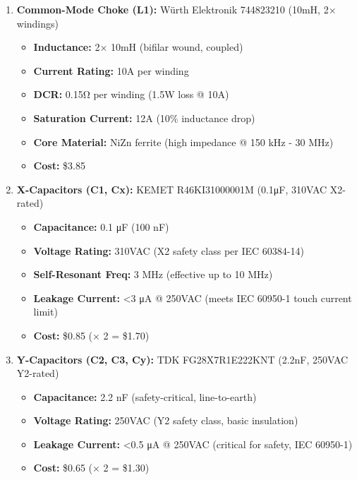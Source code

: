 \documentclass[
]{article}
\providecommand{\tightlist}{%
  \setlength{\itemsep}{0pt}\setlength{\parskip}{0pt}}
\begin{document}
\begin{enumerate}
\def\labelenumi{\arabic{enumi}.}
\tightlist
\item
  \textbf{Common-Mode Choke (L1):} Würth Elektronik 744823210 (10mH, 2×
  windings)

  \begin{itemize}
  \tightlist
  \item
    \textbf{Inductance:} 2× 10mH (bifilar wound, coupled)
  \item
    \textbf{Current Rating:} 10A per winding
  \item
    \textbf{DCR:} 0.15Ω per winding (1.5W loss @ 10A)
  \item
    \textbf{Saturation Current:} 12A (10\% inductance drop)
  \item
    \textbf{Core Material:} NiZn ferrite (high impedance @ 150 kHz - 30
    MHz)
  \item
    \textbf{Cost:} \$3.85
  \end{itemize}
\item
  \textbf{X-Capacitors (C1, Cx):} KEMET R46KI31000001M (0.1μF, 310VAC
  X2-rated)

  \begin{itemize}
  \tightlist
  \item
    \textbf{Capacitance:} 0.1 μF (100 nF)
  \item
    \textbf{Voltage Rating:} 310VAC (X2 safety class per IEC 60384-14)
  \item
    \textbf{Self-Resonant Freq:} 3 MHz (effective up to 10 MHz)
  \item
    \textbf{Leakage Current:} \textless3 μA @ 250VAC (meets IEC 60950-1
    touch current limit)
  \item
    \textbf{Cost:} \$0.85 (× 2 = \$1.70)
  \end{itemize}
\item
  \textbf{Y-Capacitors (C2, C3, Cy):} TDK FG28X7R1E222KNT (2.2nF, 250VAC
  Y2-rated)

  \begin{itemize}
  \tightlist
  \item
    \textbf{Capacitance:} 2.2 nF (safety-critical, line-to-earth)
  \item
    \textbf{Voltage Rating:} 250VAC (Y2 safety class, basic insulation)
  \item
    \textbf{Leakage Current:} \textless0.5 μA @ 250VAC (critical for
    safety, IEC 60950-1)
  \item
    \textbf{Cost:} \$0.65 (× 2 = \$1.30)
  \end{itemize}
\end{enumerate}
\end{document}
